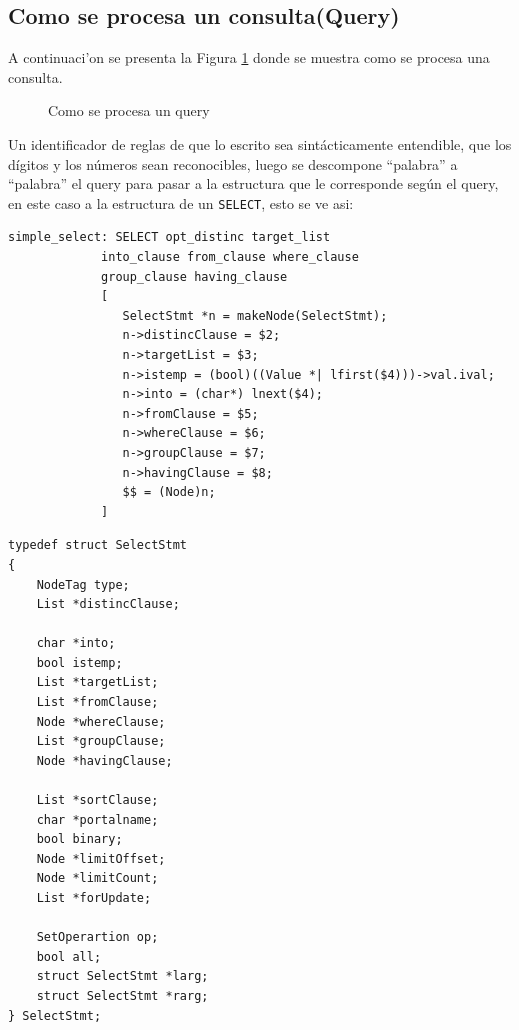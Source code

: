 \subsection{Como se procesa un consulta(Query)}
A continuaci'on se presenta la Figura \ref{fig:comoprocesaquery2} donde se muestra como se procesa una consulta.
\begin{figure}[H]
\centering
{}
\caption{Como se procesa un query \cite{postgresqlpordentro}} 
\label{fig:comoprocesaquery2}
\end{figure}

Un identificador de reglas de que lo escrito sea sint\'acticamente entendible, que los d\'igitos y los n\'umeros sean reconocibles, luego se descompone ``palabra'' a ``palabra'' el query para pasar a la estructura que le corresponde seg\'un el query, en este caso a la estructura de un \texttt{SELECT}, esto se ve asi:
\lstset{language=sql,breaklines=true}
\label{fig:codigosqlc}
\begin{lstlisting}
simple_select: SELECT opt_distinc target_list
			 into_clause from_clause where_clause
			 group_clause having_clause
			 [
			 	SelectStmt *n = makeNode(SelectStmt);
			 	n->distincClause = $2;
			 	n->targetList = $3;
			 	n->istemp = (bool)((Value *| lfirst($4)))->val.ival;
			 	n->into = (char*) lnext($4);
			 	n->fromClause = $5;
			 	n->whereClause = $6;
				n->groupClause = $7;
				n->havingClause = $8;
				$$ = (Node)n;			 	
			 ]	
\end{lstlisting}

\lstset{language=c,breaklines=true}
\begin{lstlisting}
typedef struct SelectStmt
{
	NodeTag	type;
	List *distincClause;
	
	char *into;
	bool istemp;
	List *targetList;
	List *fromClause;
	Node *whereClause;
	List *groupClause;
	Node *havingClause;
	
	List *sortClause;
	char *portalname;
	bool binary;
	Node *limitOffset;
	Node *limitCount;
	List *forUpdate;
	
	SetOperartion op;
	bool all;
	struct SelectStmt *larg;
	struct SelectStmt *rarg;		
} SelectStmt;	
\end{lstlisting}


